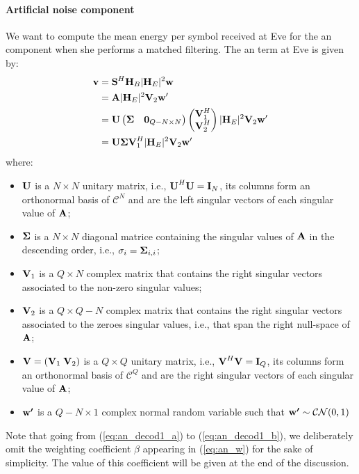 \paragraph*{Artificial noise component}
We want to compute the mean energy per symbol received at Eve for the \gls{an} component when she performs a matched filtering. The \gls{an} term at Eve is given by:
\begin{subequations}
\begin{align}
\boldsymbol{\mathrm{v}}&=	\boldsymbol{\mathrm{S}}^H \boldsymbol{\mathrm{H}}_B |\boldsymbol{\mathrm{H}}_E|^2 \boldsymbol{\mathrm{w}} \label{eq:an_decod1_a}\\
&=\boldsymbol{\mathrm{A}} |\boldsymbol{\mathrm{H}}_E|^2 \boldsymbol{\mathrm{V}}_2 \boldsymbol{\mathrm{w}}' \label{eq:an_decod1_b}\\
&= \boldsymbol{\mathrm{U}} \begin{pmatrix}
\boldsymbol{\mathrm{\Sigma}} & \boldsymbol{\mathrm{0}}_{Q-N\times N}
\end{pmatrix}  \begin{pmatrix}
\boldsymbol{\mathrm{V}}_1^H\\
\boldsymbol{\mathrm{V}}_2^H
\end{pmatrix} |\boldsymbol{\mathrm{H}}_E|^2 \boldsymbol{\mathrm{V}}_2 \boldsymbol{\mathrm{w}}'\\
&=\boldsymbol{\mathrm{U}} \boldsymbol{\mathrm{\Sigma}}\boldsymbol{\mathrm{V}}_1^H |\boldsymbol{\mathrm{H}}_E|^2 \boldsymbol{\mathrm{V}}_2 \boldsymbol{\mathrm{w}}'
\end{align}
\end{subequations}
where:
\begin{itemize}
	\item $\boldsymbol{\mathrm{U}}$ is a $N \times N$ unitary matrix, i.e., $\boldsymbol{\mathrm{U}}^H \boldsymbol{\mathrm{U}} = \boldsymbol{\mathrm{I}}_N$, its columns form an orthonormal basis of $\mathcal{C}^N$ and are the left singular vectors of each singular value of $\boldsymbol{\mathrm{A}}$;
	\item $\boldsymbol{\mathrm{\Sigma}}$ is a $N \times N$ diagonal matrice containing the singular values of $\boldsymbol{\mathrm{A}}$ in the descending order, i.e., $\sigma_i = \boldsymbol{\mathrm{\Sigma}}_{i,i}$;
	\item $\boldsymbol{\mathrm{V}}_1$ is a $Q \times N$ complex matrix that contains the right singular vectors associated to the non-zero singular values;
	\item $\boldsymbol{\mathrm{V}}_2$ is a $Q \times Q-N$ complex matrix that contains the right singular vectors associated to the zeroes singular values, i.e., that span the right null-space of $\boldsymbol{\mathrm{A}}$;
	\item $\boldsymbol{\mathrm{V}} = \left(\boldsymbol{\mathrm{V}}_1 \; \boldsymbol{\mathrm{V}}_2\right)$ is a $Q \times Q$ unitary matrix, i.e., $\boldsymbol{\mathrm{V}}^H \boldsymbol{\mathrm{V}} = \boldsymbol{\mathrm{I}}_Q$, its columns form an orthonormal basis of $\mathcal{C}^Q$ and are the right singular vectors of each singular value of $\boldsymbol{\mathrm{A}}$;
	\item $\boldsymbol{\mathrm{w'}}$ is a $Q-N \times 1$ complex normal random variable such that $\boldsymbol{\mathrm{w'}} \sim \mathcal{CN}(0,1)$
\end{itemize} 
Note that going from (\ref{eq:an_decod1_a}) to (\ref{eq:an_decod1_b}), we deliberately omit the weighting coefficient $\beta$ appearing in (\ref{eq:an_w}) for the sake of simplicity. The value of this coefficient will be given at the end of the discussion.


